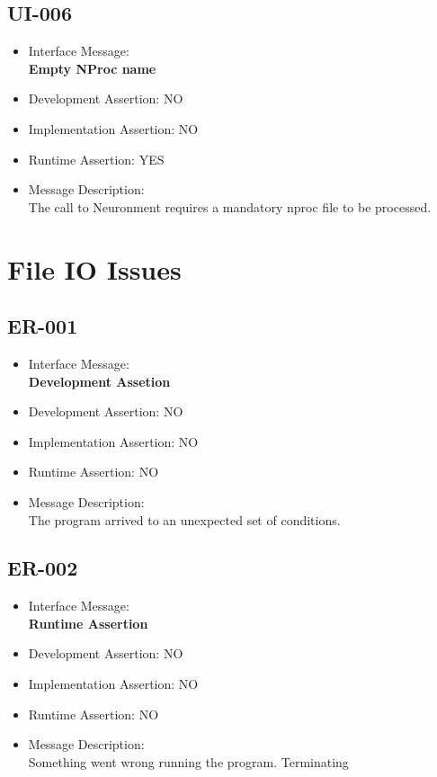 \subsection{UI-006}
\begin{itemize}
  \item Interface Message:\\[1em]\textbf{Empty NProc name}
  \item Development Assertion: NO
  \item Implementation Assertion: NO
  \item Runtime Assertion: YES
  \item Message Description:\\[1em]The call to Neuronment requires a mandatory nproc file to be processed.
\end{itemize}

\section{File IO Issues}

\subsection{ER-001}
\begin{itemize}
  \item Interface Message:\\[1em]\textbf{Development Assetion}
  \item Development Assertion: NO
  \item Implementation Assertion: NO
  \item Runtime Assertion: NO
  \item Message Description:\\[1em]The program arrived to an unexpected set of conditions.
\end{itemize}

\subsection{ER-002}
\begin{itemize}
  \item Interface Message:\\[1em]\textbf{Runtime Assertion}
  \item Development Assertion: NO
  \item Implementation Assertion: NO
  \item Runtime Assertion: NO
  \item Message Description:\\[1em]Something went wrong running the program. Terminating
\end{itemize}


